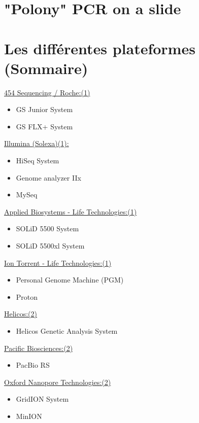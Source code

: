 \documentclass[a4paper]{article}
\begin{document}
\section{"Polony" PCR on a slide}

\section{Les différentes plateformes (Sommaire)}


\underline{454 Sequencing / Roche:(1)}
\begin{itemize}
\item GS Junior System
\item GS FLX+ System 
\end{itemize}

\underline{Illumina (Solexa)(1):}
\begin{itemize}
\item HiSeq System 
\item Genome analyzer IIx 
\item MySeq
\end{itemize}

\underline{Applied Biosystems - Life Technologies:(1)}
\begin{itemize}
\item SOLiD 5500 System
\item SOLiD 5500xl System
\end{itemize}

\underline{Ion Torrent - Life Technologies:(1)}
\begin{itemize}
\item Personal Genome Machine (PGM)
\item Proton
\end{itemize}

\underline{Helicos:(2)}
\begin{itemize}
\item Helicos Genetic Analysis System 
\end{itemize}

\underline{Pacific Biosciences:(2)}
\begin{itemize}
\item PacBio RS
\end{itemize}

\underline{Oxford Nanopore Technologies:(2)}
\begin{itemize}
\item GridION System 
\item MinION
\end{itemize}
\end{document}
